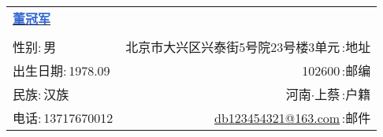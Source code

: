 \newcommand{\myheader}{
    \begin{tabular*}{\textwidth}{l@{\extracolsep{\fill}}r}
        \textbf{\href{https://herechen.github.io}{\LARGE \textcolor{highlight}{董冠军}}} \\
        \\
        {\color{blue}性别:}$\,$男 & 北京市大兴区兴泰街5号院23号楼3单元$\,${\color{blue}:地址} \\
        {\color{blue}出生日期:}$\,$1978.09 & 102600$\,${\color{blue}:邮编} \\
        {\color{blue}民族:}$\,$汉族 & 河南$\cdot$上蔡$\,${\color{blue}:户籍} \\
        {\color{blue}电话:}$\,$13717670012 & \href{mailto:db123454321@163.com}{db123454321@163.com}$\,${\color{blue}:邮件} \\
    \end{tabular*}\\\vspace{0.1in}}

\myheader
